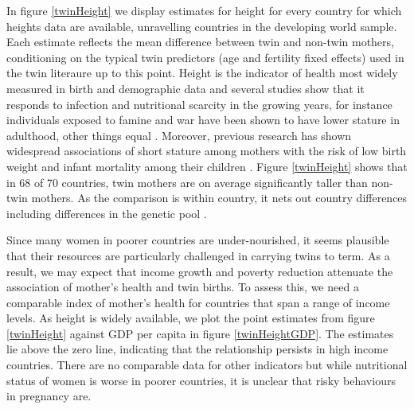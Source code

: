 \documentclass[subeqn]{article}
\begin{document}
\begin{spacing}{1.4}
In figure \ref{twinHeight} we display estimates for height for every
country for which heights data are available, unravelling countries in the
developing world sample. Each estimate reflects the mean difference between
twin and non-twin mothers, conditioning on the typical twin predictors (age
and fertility fixed effects) used in the twin literaure up to this point.
Height is the indicator of health most widely measured in birth and
demographic data and several studies show that it responds to infection and
nutritional scarcity in the growing years, for instance individuals exposed
to famine and war have been shown to have lower stature in adulthood, other
things equal \citep{Silventoinen2003,Bozzolietal2009,Wangetal2010,Akreshetal2012}.
Moreover, previous research has shown widespread associations of short stature
among mothers with the risk of low birth weight and infant mortality among
their children \citep{BhalotraRawlings2013}.  Figure \ref{twinHeight}
shows that in 68 of 70 countries, twin mothers are on average significantly
taller than non-twin mothers. As the comparison is within country, it nets
out country differences including differences in the genetic pool
\citep{Deaton2007}. 

Since many women in poorer countries are under-nourished, it seems plausible
that their resources are particularly challenged in carrying twins to term. As
a result, we may expect that income growth and poverty reduction attenuate the
association of mother's health and twin births. To assess this, we need a
comparable index of mother's health for countries that span a range of income
levels. As height is widely available, we plot the point estimates from figure
\ref{twinHeight} against GDP per capita in figure \ref{twinHeightGDP}. The
estimates lie above the zero line, indicating that the relationship persists
in high income countries. There are no comparable data for other indicators
but while nutritional status of women is worse in poorer countries, it is
unclear that risky behaviours in pregnancy are.  %


\end{spacing}
\end{document}
